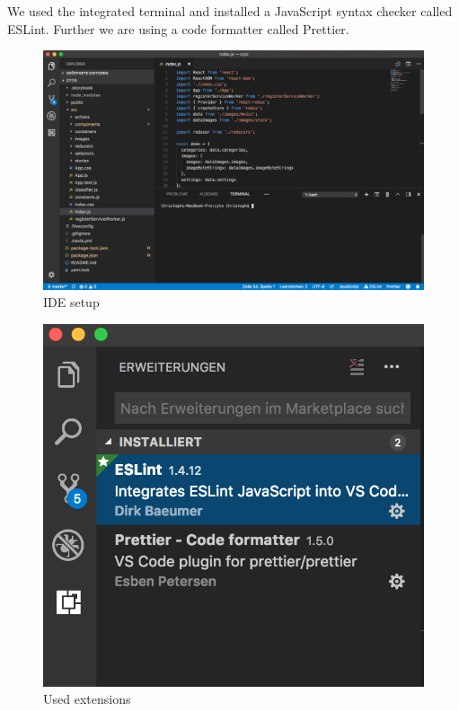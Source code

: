 We used the integrated terminal and installed a JavaScript syntax checker called ESLint. Further we are using a code formatter called Prettier. 

\begin{figure}[H]
	\centering
	\includegraphics[width=\linewidth]{bilder/cyto/IDE.png}
	\caption{IDE setup}
	\label{fig:IDE}
\end{figure}

\begin{figure}[H]
	\centering
	\includegraphics[scale=0.5]{bilder/cyto/LINT.png}
	\caption{Used extensions}
	\label{fig:Extensions}
\end{figure}

